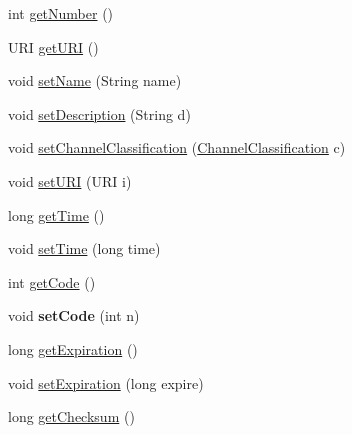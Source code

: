 \begin{DoxyCompactItemize}
\item 
int \hyperlink{classgov_1_1fnal_1_1ppd_1_1dd_1_1channel_1_1ChannelImpl_a9d5fbb02930a03147b1240db1371c57a}{get\-Number} ()
\item 
U\-R\-I \hyperlink{classgov_1_1fnal_1_1ppd_1_1dd_1_1channel_1_1ChannelImpl_a9004e74f2476cb8f7a4d56285d49ba45}{get\-U\-R\-I} ()
\item 
void \hyperlink{classgov_1_1fnal_1_1ppd_1_1dd_1_1channel_1_1ChannelImpl_a0d227de9590cc6ce476497c8f919f2e4}{set\-Name} (String name)
\item 
void \hyperlink{classgov_1_1fnal_1_1ppd_1_1dd_1_1channel_1_1ChannelImpl_abb1380a6a0403aa8b3603d39cdc38ea4}{set\-Description} (String d)
\item 
void \hyperlink{classgov_1_1fnal_1_1ppd_1_1dd_1_1channel_1_1ChannelImpl_a4e64970f8cfaf5c9fabe173feb40a0d4}{set\-Channel\-Classification} (\hyperlink{classgov_1_1fnal_1_1ppd_1_1dd_1_1changer_1_1ChannelClassification}{Channel\-Classification} c)
\item 
void \hyperlink{classgov_1_1fnal_1_1ppd_1_1dd_1_1channel_1_1ChannelImpl_a685f3caf0f4e3d501e68c55794f38111}{set\-U\-R\-I} (U\-R\-I i)
\item 
long \hyperlink{classgov_1_1fnal_1_1ppd_1_1dd_1_1channel_1_1ChannelImpl_aa2d5c561810b90f2401e5da2c1972774}{get\-Time} ()
\item 
void \hyperlink{classgov_1_1fnal_1_1ppd_1_1dd_1_1channel_1_1ChannelImpl_ae5c03927d8473ecae11b4002395da886}{set\-Time} (long time)
\item 
int \hyperlink{classgov_1_1fnal_1_1ppd_1_1dd_1_1channel_1_1ChannelImpl_ab7c659985471afada6dece70c1d75b61}{get\-Code} ()
\item 
\hypertarget{classgov_1_1fnal_1_1ppd_1_1dd_1_1channel_1_1ChannelImpl_aa13af9f5763f97581ec533f91e380906}{void {\bfseries set\-Code} (int n)}\label{classgov_1_1fnal_1_1ppd_1_1dd_1_1channel_1_1ChannelImpl_aa13af9f5763f97581ec533f91e380906}

\item 
long \hyperlink{classgov_1_1fnal_1_1ppd_1_1dd_1_1channel_1_1ChannelImpl_af509fea6b9340b85522025b70cc4e64e}{get\-Expiration} ()
\item 
void \hyperlink{classgov_1_1fnal_1_1ppd_1_1dd_1_1channel_1_1ChannelImpl_a9428ab2c22c4272e97c2251eb38e8b2e}{set\-Expiration} (long expire)
\item 
long \hyperlink{classgov_1_1fnal_1_1ppd_1_1dd_1_1channel_1_1ChannelImpl_abfc920cea3e8ce7156aad3d9a87213c8}{get\-Checksum} ()
\end{DoxyCompactItemize}
